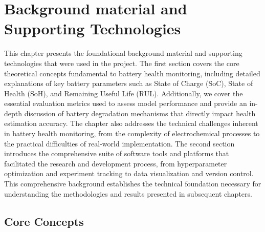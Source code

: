 \chapter{Background material and Supporting Technologies}
\label{ch:background}

This chapter presents the foundational background material and supporting technologies that were used in the project. The first section covers the core theoretical concepts fundamental to battery health monitoring, including detailed explanations of key battery parameters such as State of Charge (SoC), State of Health (SoH), and Remaining Useful Life (RUL). Additionally, we cover the essential evaluation metrics used to assess model performance and provide an in-depth discussion of battery degradation mechanisms that directly impact health estimation accuracy. The chapter also addresses the technical challenges inherent in battery health monitoring, from the complexity of electrochemical processes to the practical difficulties of real-world implementation. The second section introduces the comprehensive suite of software tools and platforms that facilitated the research and development process, from hyperparameter optimization and experiment tracking to data visualization and version control. This comprehensive background establishes the technical foundation necessary for understanding the methodologies and results presented in subsequent chapters.

\section{Core Concepts}

